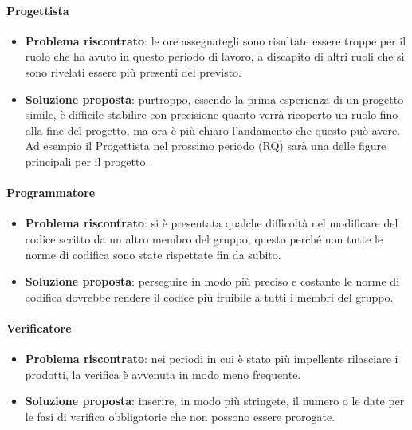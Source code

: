         \paragraph{Progettista}
            \begin{itemize}
                \item \textbf{Problema riscontrato}: le ore assegnategli sono risultate essere troppe per il ruolo che ha avuto in questo periodo di lavoro, a discapito di altri ruoli che si sono rivelati essere più presenti del previsto.
                \item \textbf{Soluzione proposta}: purtroppo, essendo la prima esperienza di un progetto simile, è difficile stabilire con precisione quanto verrà ricoperto un ruolo fino alla fine del progetto, ma ora è più chiaro l'andamento che questo può avere. Ad esempio il Progettista nel prossimo periodo (RQ) sarà una delle figure principali per il progetto.
            \end{itemize}
        
        \paragraph{Programmatore}
            \begin{itemize}
                \item \textbf{Problema riscontrato}: si è presentata qualche difficoltà nel modificare del codice scritto da un altro membro del gruppo, questo perché non tutte le norme di codifica sono state rispettate fin da subito.
                \item \textbf{Soluzione proposta}: perseguire in modo più preciso e costante le norme di codifica dovrebbe rendere il codice più fruibile a tutti i membri del gruppo.
            \end{itemize}
        
        \paragraph{Verificatore}
            \begin{itemize}
                \item \textbf{Problema riscontrato}: nei periodi in cui è stato più impellente rilasciare i prodotti, la verifica è avvenuta in modo meno frequente.
                \item \textbf{Soluzione proposta}: inserire, in modo più stringete, il numero o le date per le fasi di verifica obbligatorie che non possono essere prorogate.
            \end{itemize}
    
